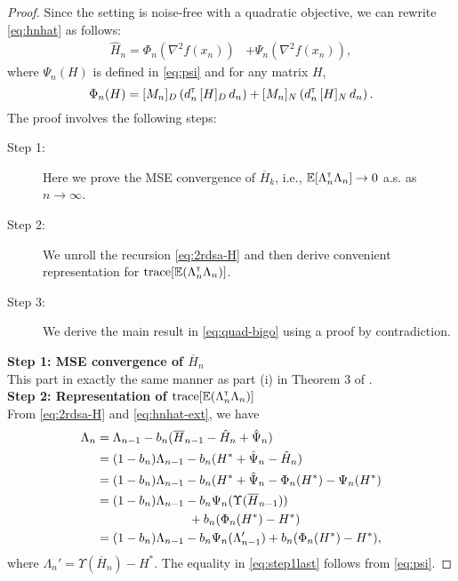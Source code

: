 \begin{proof}
Since the setting is noise-free with a quadratic objective, we can rewrite \eqref{eq:hnhat} as follows:
\begin{align}
 \widehat H_n =    \Phi_n(\nabla^2 f(x_n)) &+\Psi_{n}(\nabla^2 f(x_n)),\label{eq:hnhat-ext}
\end{align}
where $\Psi_n(H)$ is defined in \eqref{eq:psi} and for any matrix $H$, 
$$\Phi_{n}(H) = [M_n]_{D}\left(d_{n}^\mathsf{\scriptscriptstyle T} \, [H]_{D} \, d_{n}\right) +  [M_n]_{N}\left(d_{n}^\mathsf{\scriptscriptstyle T} \, [H]_{N} \, d_{n}\right).$$
The proof involves the following steps:
\begin{description}
  \item[Step 1:] Here we prove the MSE convergence of $\overline H_k$, i.e., $\mathbb{E} [\Lambda_n^\mathsf{\scriptscriptstyle T} \Lambda_n] \rightarrow 0$ a.s. as $n\rightarrow \infty$.
  \item[Step 2:] We unroll the recursion \eqref{eq:2rdsa-H} and then derive convenient representation for $\text{trace}[\mathbb{E} (\Lambda_n ^\mathsf{\scriptscriptstyle T} \Lambda_n)]$.
  \item[Step 3:] We derive the main result in \eqref{eq:quad-bigo} using a proof by contradiction. 
\end{description}
\noindent\textbf{Step 1: MSE convergence of $\overline H_n$} \\
This part in exactly the same manner as part (i) in Theorem 3 of \cite{spall-jacobian}.\\
\noindent\textbf{Step 2: Representation of $\text{trace}[\mathbb{E} (\Lambda_n ^\mathsf{\scriptscriptstyle T} \Lambda_n)]$} \\
 From \eqref{eq:2rdsa-H} and \eqref{eq:hnhat-ext},  we have
 \begin{align}
 \Lambda_n &= \Lambda_{n-1} - b_n ( \overline H_{n-1} - \hat H_n + \hat \Psi_n) \nonumber\\
&= (1-b_n) \Lambda_{n-1} - b_n (H^* + \hat \Psi_n - \hat H_n ) \nonumber\\&= (1-b_n) \Lambda_{n-1} - b_n (H^*+\hat \Psi_n -\Phi_n(H^*) - \Psi_n(H^*)\nonumber\\&= (1-b_n) \Lambda_{n-1} - b_n \Psi_n(\Upsilon(\overline H_{n-1})) \nonumber\\& \hspace{2.6cm}+ b_n (\Phi_n(H^*) - H^*)\nonumber\\
&= (1-b_n) \Lambda_{n-1} - b_n\Psi_n(\Lambda_{n-1}')+ b_n (\Phi_n(H^*) - H^*),\label{eq:step1last}
 \end{align}
where $\Lambda_n' = \Upsilon(\overline H_n) - H^*$.
The equality in \eqref{eq:step1last} follows from \eqref{eq:psi}. 

\end{proof}
